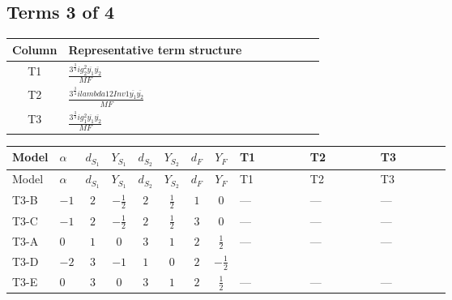 \documentclass[8pt]{article}
\begin{document}
\begin{landscape}
\subsection*{Terms 3 of 4}
\begin{center}
\begin{tabular}{@{}c >{\raggedright\arraybackslash}p{0.82\linewidth}@{}}
\toprule
Column & Representative term structure \\
\midrule
T1 & \(\displaystyle \frac{3^{\frac{3}{4}} i g_{2}^{2} \overline{y_{1}} \overline{y_{2}}}{MF}\) \\
\midrule
T2 & \(\displaystyle \frac{3^{\frac{3}{4}} i lambda12Inv1 \overline{y_{1}} \overline{y_{2}}}{MF}\) \\
\midrule
T3 & \(\displaystyle \frac{3^{\frac{3}{4}} i g_{1}^{2} \overline{y_{1}} \overline{y_{2}}}{MF}\) \\
\midrule
\bottomrule
\end{tabular}
\end{center}
\smallskip
\tiny
\begin{longtable}{@{}llcccccc >{\raggedright\arraybackslash}p{0.21\linewidth} >{\raggedright\arraybackslash}p{0.21\linewidth} >{\raggedright\arraybackslash}p{0.21\linewidth}@{}}
\toprule
Model & $\alpha$ & $d_{S_1}$ & $Y_{S_1}$ & $d_{S_2}$ & $Y_{S_2}$ & $d_F$ & $Y_F$ & T1 & T2 & T3 \\
\midrule
\endfirsthead
\toprule
Model & $\alpha$ & $d_{S_1}$ & $Y_{S_1}$ & $d_{S_2}$ & $Y_{S_2}$ & $d_F$ & $Y_F$ & T1 & T2 & T3 \\
\midrule
\endhead
T3-B & $-1$ & $2$ & $-\frac{1}{2}$ & $2$ & $\frac{1}{2}$ & $1$ & $0$ & --- & --- & --- \\
\midrule
T3-C & $-1$ & $2$ & $-\frac{1}{2}$ & $2$ & $\frac{1}{2}$ & $3$ & $0$ & --- & --- & --- \\
\midrule
T3-A & $0$ & $1$ & $0$ & $3$ & $1$ & $2$ & $\frac{1}{2}$ & --- & --- & --- \\
\midrule
T3-D & $-2$ & $3$ & $-1$ & $1$ & $0$ & $2$ & $-\frac{1}{2}$ & \scriptsize\adjustbox{max width=\linewidth}{$\begin{gathered} - \frac{25 \cdot 3^{\frac{3}{4}} i g_{2}^{2} \overline{y_{1}} \overline{y_{2}}}{24 MF}\end{gathered}$} & \scriptsize\adjustbox{max width=\linewidth}{$\begin{gathered} - \frac{3^{\frac{3}{4}} i lambda12Inv1 \overline{y_{1}} \overline{y_{2}}}{6 MF}\end{gathered}$} & \scriptsize\adjustbox{max width=\linewidth}{$\begin{gathered} - \frac{3^{\frac{3}{4}} i g_{1}^{2} \overline{y_{1}} \overline{y_{2}}}{8 MF}\end{gathered}$} \\
\midrule
T3-E & $0$ & $3$ & $0$ & $3$ & $1$ & $2$ & $\frac{1}{2}$ & --- & --- & --- \\
\midrule
\bottomrule
\end{longtable}
\clearpage

\end{landscape}
\end{document}
